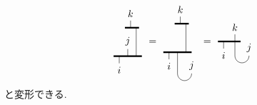 \documentclass[dvipdfmx]{jsarticle}
\begin{document}
\begin{equation*}
    \vcenter{\hbox{
        \begin{tikzpicture}
            \draw[ultra thick](0,0)--++(1,0);
            \draw[ultra thick](.4,1)--++(.5,0);
            \draw
                (.8,0)--++(0,1)
                (.5,0)--++(0,.25)node[anchor=south]{$j$}
                (.2,0)--++(0,-.25)node[anchor=north]{$i$}
                (.6,1)--++(0,.25)node[anchor=south]{$k$}
            ;
        \end{tikzpicture}
    }}
    =
    \vcenter{\hbox{
        \begin{tikzpicture}
            \draw[ultra thick](0,0)--++(1,0);
            \draw[ultra thick](.4,1)--++(.5,0);
            \draw
                (.8,0)--++(0,1)
                (.5,0)--++(0,-.75)arc(-180:0:.25)node[anchor=south]{$j$}
                (.2,0)--++(0,-.25)node[anchor=north]{$i$}
                (.6,1)--++(0,.25)node[anchor=south]{$k$}
            ;
        \end{tikzpicture}
    }}
    =
    \vcenter{\hbox{
        \begin{tikzpicture}
            \draw[ultra thick](0,0)--++(.8,0);
            \draw(.2,0)--++(0,-.25)node[anchor=north]{$i$};
            \draw(.6,0)--++(0,.25)node[anchor=south]{$k$};
            \draw(.6,0)--++(0,-.5)arc(-180:0:.25)node[anchor=south]{$j$};
        \end{tikzpicture}
    }}
\end{equation*}
と変形できる.
\end{document}
